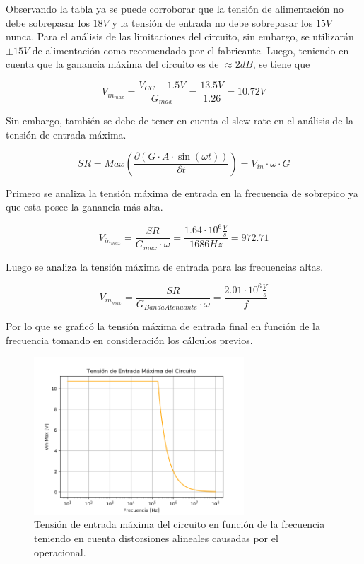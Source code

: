 \documentclass[a4paper]{article}
\begin{document}
Observando la tabla ya se puede corroborar que la tensión de alimentación no debe sobrepasar los $18V$ y la tensión de entrada no debe sobrepasar los $15V$ nunca. Para el análisis de las limitaciones del circuito, sin embargo, se utilizarán $\pm 15V$ de alimentación como recomendado por el fabricante.
Luego, teniendo en cuenta que la ganancia máxima del circuito es de $\approx 2dB$, se tiene que

\begin{equation}
	V_{in_{max}} = \frac{V_{CC} - 1.5V}{G_{max}} = \frac{13.5V}{1.26} = 10.72V
\end{equation}

Sin embargo, también se debe de tener en cuenta el slew rate en el análisis de la tensión de entrada máxima.

\begin{equation}
	SR= Max\left( \frac{\partial (G\cdot A\cdot \sin (\omega t))}{\partial t}\right) = V_{in} \cdot \omega \cdot G  
\end{equation}

Primero se analiza la tensión máxima de entrada en la frecuencia de sobrepico ya que esta posee la ganancia más alta.

\begin{equation}
	V_{in_{max}} = \frac{SR}{G_{max}\cdot \omega} = \frac{1.64\cdot 10^6\frac{V}{s}}{1686Hz} = 972.71
\end{equation}

Luego se analiza la tensión máxima de entrada para las frecuencias altas.

\begin{equation}
	V_{in_{max}} = \frac{SR}{G_{Banda Atenuante}\cdot \omega} = \frac{2.01\cdot 10^6\frac{V}{s}}{f}
\end{equation}

Por lo que se graficó la tensión máxima de entrada final en función de la frecuencia tomando en consideración los cálculos previos.

\begin{figure} [H]
	\centering
	\includegraphics[width=0.7\textwidth]{Imagenes/vin_max.PNG}
	\caption{Tensión de entrada máxima del circuito en función de la frecuencia teniendo en cuenta distorsiones alineales causadas por el operacional.}
	\label{fig:vin_max}
\end{figure}
\end{document}
